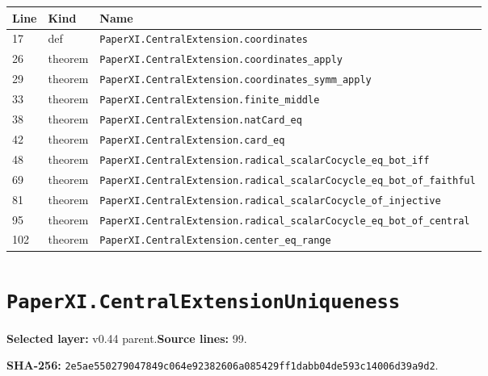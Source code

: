 \documentclass[10pt,oneside]{book}
\begin{document}
\begin{longtable}{@{}p{}p{}p{}@{}}\toprule Line&Kind&Name\\\midrule\endhead

17&def&\nolinkurl{PaperXI.CentralExtension.coordinates}\\

26&theorem&\nolinkurl{PaperXI.CentralExtension.coordinates_apply}\\

29&theorem&\nolinkurl{PaperXI.CentralExtension.coordinates_symm_apply}\\

33&theorem&\nolinkurl{PaperXI.CentralExtension.finite_middle}\\

38&theorem&\nolinkurl{PaperXI.CentralExtension.natCard_eq}\\

42&theorem&\nolinkurl{PaperXI.CentralExtension.card_eq}\\

48&theorem&\nolinkurl{PaperXI.CentralExtension.radical_scalarCocycle_eq_bot_iff}\\

69&theorem&\nolinkurl{PaperXI.CentralExtension.radical_scalarCocycle_eq_bot_of_faithful}\\

81&theorem&\nolinkurl{PaperXI.CentralExtension.radical_scalarCocycle_of_injective}\\

95&theorem&\nolinkurl{PaperXI.CentralExtension.radical_scalarCocycle_eq_bot_of_central}\\

102&theorem&\nolinkurl{PaperXI.CentralExtension.center_eq_range}\\

\bottomrule\end{longtable}

\section{\texorpdfstring{\nolinkurl{PaperXI.CentralExtensionUniqueness}}{PaperXI.CentralExtensionUniqueness}}\label{module:PaperXI.CentralExtensionUniqueness}

\textbf{Selected layer:} v0.44 parent.\quad\textbf{Source lines:} 99.\par\textbf{SHA-256:} {\scriptsize\nolinkurl{2e5ae550279047849c064e92382606a085429ff1dabb04de593c14006d39a9d2}}.
\end{document}
